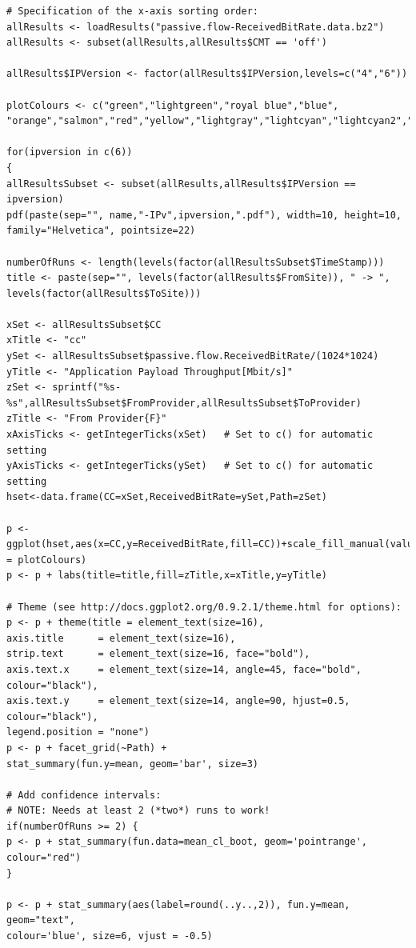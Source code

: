 \documentclass[a4paper,12pt]{ctexbook}
\begin{document}
\begin{flushleft}
\begin{verbatim}
# Specification of the x-axis sorting order:
allResults <- loadResults("passive.flow-ReceivedBitRate.data.bz2")
allResults <- subset(allResults,allResults$CMT == 'off')

allResults$IPVersion <- factor(allResults$IPVersion,levels=c("4","6"))

plotColours <- c("green","lightgreen","royal blue","blue", "orange","salmon","red","yellow","lightgray","lightcyan","lightcyan2","lightcyan3","lightcyan4","orchid","orchid1","orchid2","orchid3","orchid4")

for(ipversion in c(6))
{
allResultsSubset <- subset(allResults,allResults$IPVersion == ipversion)
pdf(paste(sep="", name,"-IPv",ipversion,".pdf"), width=10, height=10, family="Helvetica", pointsize=22)

numberOfRuns <- length(levels(factor(allResultsSubset$TimeStamp)))
title <- paste(sep="", levels(factor(allResults$FromSite)), " -> ", levels(factor(allResults$ToSite)))

xSet <- allResultsSubset$CC
xTitle <- "cc"
ySet <- allResultsSubset$passive.flow.ReceivedBitRate/(1024*1024)
yTitle <- "Application Payload Throughput[Mbit/s]"
zSet <- sprintf("%s-%s",allResultsSubset$FromProvider,allResultsSubset$ToProvider)
zTitle <- "From Provider{F}"
xAxisTicks <- getIntegerTicks(xSet)   # Set to c() for automatic setting
yAxisTicks <- getIntegerTicks(ySet)   # Set to c() for automatic setting
hset<-data.frame(CC=xSet,ReceivedBitRate=ySet,Path=zSet)

p <- ggplot(hset,aes(x=CC,y=ReceivedBitRate,fill=CC))+scale_fill_manual(values = plotColours)
p <- p + labs(title=title,fill=zTitle,x=xTitle,y=yTitle)

# Theme (see http://docs.ggplot2.org/0.9.2.1/theme.html for options):
p <- p + theme(title = element_text(size=16),
axis.title      = element_text(size=16),
strip.text      = element_text(size=16, face="bold"),
axis.text.x     = element_text(size=14, angle=45, face="bold", colour="black"),
axis.text.y     = element_text(size=14, angle=90, hjust=0.5, colour="black"),
legend.position = "none")
p <- p + facet_grid(~Path) + 
stat_summary(fun.y=mean, geom='bar', size=3)

# Add confidence intervals:
# NOTE: Needs at least 2 (*two*) runs to work!
if(numberOfRuns >= 2) {
p <- p + stat_summary(fun.data=mean_cl_boot, geom='pointrange', colour="red")
}

p <- p + stat_summary(aes(label=round(..y..,2)), fun.y=mean, geom="text",
colour='blue', size=6, vjust = -0.5)


\end{verbatim}
\end{flushleft}
\end{document}
